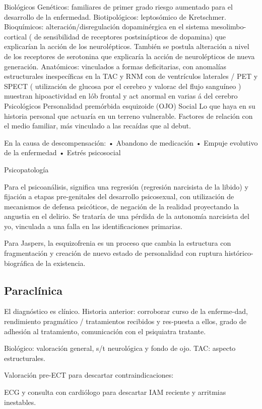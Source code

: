 \documentclass{scrbook}
\begin{document}
Biológicos Genéticos: familiares de primer grado riesgo aumentado para el desarrollo de la enfermedad. Biotipológicos: leptosómico de Kretschmer. Bioquímicos: alteración/disregulación dopaminérgica en el sistema mesolimbo-cortical ( de sensibilidad de receptores postsinápticos de dopamina) que explicarían la acción de los neurolépticos. También se postula alteración a nivel de los receptores de serotonina que explicaría la acción de neurolépticos de nueva generación. Anatómicos: vinculados a formas deficitarias, con anomalías estructurales inespecíficas en la TAC y RNM con de ventrículos laterales / PET y SPECT ( utilización de glucosa por el cerebro y valorac del flujo sanguíneo ) muestran hipoactividad en lób frontal y act anormal en varias á del cerebro Psicológicos Personalidad premórbida esquizoide (OJO) Social Lo que haya en su historia personal que actuaría en un terreno vulnerable. Factores de relación con el medio familiar, más vinculado a las recaídas que al debut.

En la causa de descompensación: • Abandono de medicación • Empuje evolutivo de la enfermedad • Estrés psicosocial

Psicopatología

Para el psicoanálisis, significa una regresión (regresión narcisista de la libido) y fijación a etapas pre-genitales del desarrollo psicosexual, con utilización de mecanismos de defensa psicóticos, de negación de la realidad proyectando la angustia en el delirio. Se trataría de una pérdida de la autonomía narcisista del yo, vinculada a una falla en las identificaciones primarias.

Para Jaspers, la esquizofrenia es un proceso que cambia la estructura con fragmentación y creación de nuevo estado de personalidad con ruptura histórico-biográfica de la existencia.
\subsection*{Paraclínica}
El diagnóstico es clínico. Historia anterior: corroborar curso de la enferme-dad, rendimiento pragmático / tratamientos recibidos y res-puesta a ellos, grado de adhesión al tratamiento, comunicación con el psiquiatra tratante.

Biológico: valoración general, s/t neurológica y fondo de ojo. TAC: aspecto estructurales.

Valoración pre-ECT para descartar contraindicaciones:

ECG y consulta con cardiólogo para descartar IAM reciente y arritmias inestables.
\end{document}
